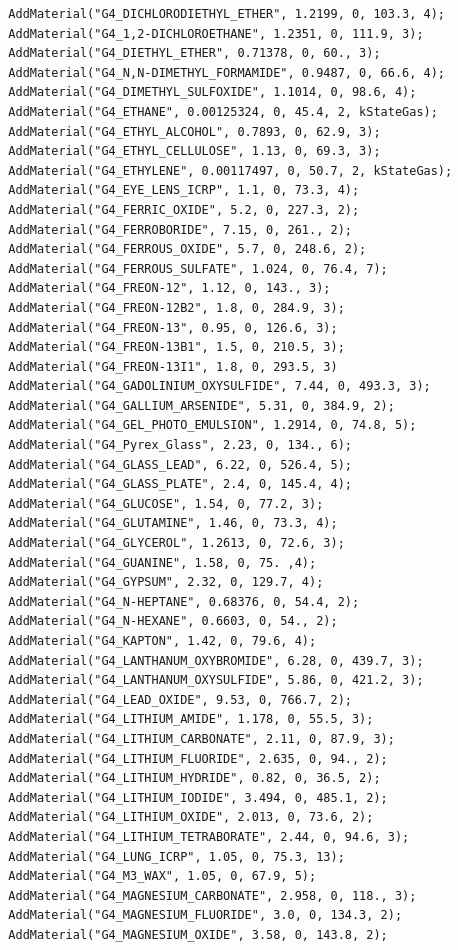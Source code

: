\documentclass[a4paper,12pt]{article}
\begin{document}
\begin{verbatim}
  AddMaterial("G4_DICHLORODIETHYL_ETHER", 1.2199, 0, 103.3, 4);
  AddMaterial("G4_1,2-DICHLOROETHANE", 1.2351, 0, 111.9, 3);
  AddMaterial("G4_DIETHYL_ETHER", 0.71378, 0, 60., 3);
  AddMaterial("G4_N,N-DIMETHYL_FORMAMIDE", 0.9487, 0, 66.6, 4);
  AddMaterial("G4_DIMETHYL_SULFOXIDE", 1.1014, 0, 98.6, 4);
  AddMaterial("G4_ETHANE", 0.00125324, 0, 45.4, 2, kStateGas);
  AddMaterial("G4_ETHYL_ALCOHOL", 0.7893, 0, 62.9, 3);
  AddMaterial("G4_ETHYL_CELLULOSE", 1.13, 0, 69.3, 3);
  AddMaterial("G4_ETHYLENE", 0.00117497, 0, 50.7, 2, kStateGas);
  AddMaterial("G4_EYE_LENS_ICRP", 1.1, 0, 73.3, 4);
  AddMaterial("G4_FERRIC_OXIDE", 5.2, 0, 227.3, 2);
  AddMaterial("G4_FERROBORIDE", 7.15, 0, 261., 2);
  AddMaterial("G4_FERROUS_OXIDE", 5.7, 0, 248.6, 2);
  AddMaterial("G4_FERROUS_SULFATE", 1.024, 0, 76.4, 7);
  AddMaterial("G4_FREON-12", 1.12, 0, 143., 3);
  AddMaterial("G4_FREON-12B2", 1.8, 0, 284.9, 3);
  AddMaterial("G4_FREON-13", 0.95, 0, 126.6, 3);
  AddMaterial("G4_FREON-13B1", 1.5, 0, 210.5, 3);
  AddMaterial("G4_FREON-13I1", 1.8, 0, 293.5, 3)
  AddMaterial("G4_GADOLINIUM_OXYSULFIDE", 7.44, 0, 493.3, 3);
  AddMaterial("G4_GALLIUM_ARSENIDE", 5.31, 0, 384.9, 2);
  AddMaterial("G4_GEL_PHOTO_EMULSION", 1.2914, 0, 74.8, 5);
  AddMaterial("G4_Pyrex_Glass", 2.23, 0, 134., 6);
  AddMaterial("G4_GLASS_LEAD", 6.22, 0, 526.4, 5);
  AddMaterial("G4_GLASS_PLATE", 2.4, 0, 145.4, 4);
  AddMaterial("G4_GLUCOSE", 1.54, 0, 77.2, 3);
  AddMaterial("G4_GLUTAMINE", 1.46, 0, 73.3, 4);
  AddMaterial("G4_GLYCEROL", 1.2613, 0, 72.6, 3);
  AddMaterial("G4_GUANINE", 1.58, 0, 75. ,4);
  AddMaterial("G4_GYPSUM", 2.32, 0, 129.7, 4);
  AddMaterial("G4_N-HEPTANE", 0.68376, 0, 54.4, 2);
  AddMaterial("G4_N-HEXANE", 0.6603, 0, 54., 2);
  AddMaterial("G4_KAPTON", 1.42, 0, 79.6, 4);
  AddMaterial("G4_LANTHANUM_OXYBROMIDE", 6.28, 0, 439.7, 3);
  AddMaterial("G4_LANTHANUM_OXYSULFIDE", 5.86, 0, 421.2, 3);
  AddMaterial("G4_LEAD_OXIDE", 9.53, 0, 766.7, 2);
  AddMaterial("G4_LITHIUM_AMIDE", 1.178, 0, 55.5, 3);
  AddMaterial("G4_LITHIUM_CARBONATE", 2.11, 0, 87.9, 3);
  AddMaterial("G4_LITHIUM_FLUORIDE", 2.635, 0, 94., 2);
  AddMaterial("G4_LITHIUM_HYDRIDE", 0.82, 0, 36.5, 2);
  AddMaterial("G4_LITHIUM_IODIDE", 3.494, 0, 485.1, 2);
  AddMaterial("G4_LITHIUM_OXIDE", 2.013, 0, 73.6, 2);
  AddMaterial("G4_LITHIUM_TETRABORATE", 2.44, 0, 94.6, 3);
  AddMaterial("G4_LUNG_ICRP", 1.05, 0, 75.3, 13);
  AddMaterial("G4_M3_WAX", 1.05, 0, 67.9, 5);
  AddMaterial("G4_MAGNESIUM_CARBONATE", 2.958, 0, 118., 3);
  AddMaterial("G4_MAGNESIUM_FLUORIDE", 3.0, 0, 134.3, 2);
  AddMaterial("G4_MAGNESIUM_OXIDE", 3.58, 0, 143.8, 2);

\end{verbatim}
\end{document}
